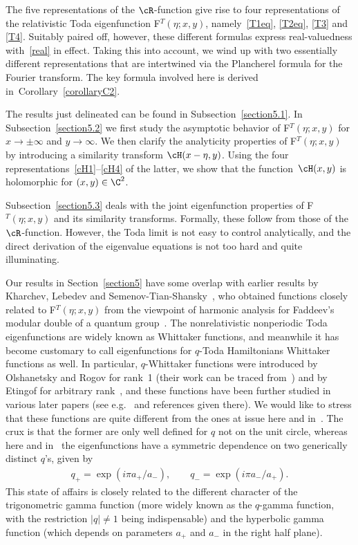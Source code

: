 \documentclass[pdftex]{sigma}
\numberwithin{equation}{section}
\begin{document}
The f\/ive representations of the $\cR$-function give rise to four representations of the relativistic Toda eigenfunction F$^T(\eta;x,y)$, namely~\eqref{T1eq}, \eqref{T2eq}, \eqref{T3} and \eqref{T4}. Suitably paired of\/f, however, these dif\/ferent formulas express real-valuedness with~\eqref{real} in ef\/fect. Taking this into account, we wind up with two essentially dif\/ferent representations that are intertwined via the Plancherel formula for the Fourier transform. The key formula involved here is derived in~Corollary~\ref{corollaryC2}.

The results just delineated can be found in Subsection~\ref{section5.1}.
In Subsection~\ref{section5.2} we f\/irst study the asymptotic behavior of F$^T(\eta;x,y)$ for $x\to \pm \infty$ and $y\to\infty$. We then clarify the analyticity properties of F$^T(\eta;x,y)$ by introducing a similarity transform $\cH(x-\eta,y)$. Using the four representations~\eqref{cH1}--\eqref{cH4} of the latter, we  show that the function~$\cH(x,y)$ is holomorphic for $(x,y)\in\C^2$.

Subsection~\ref{section5.3} deals with the joint eigenfunction properties of F$^T(\eta;x,y)$ and its similarity transforms. Formally, these follow from those of the $\cR$-function. However, the Toda limit is not easy to control analytically, and the direct derivation of the eigenvalue equations is not too hard and quite illuminating.

Our results in Section~\ref{section5} have some overlap with earlier results by Kharchev, Lebedev and Semenov-Tian-Shansky~\cite{lebe},  who obtained functions closely related to
F$^T(\eta;x,y)$ from the viewpoint of harmonic analysis for Faddeev's modular double of a quantum group~\cite{fadd1}. The non\-relativistic nonperiodic Toda eigenfunctions are widely known as Whittaker functions, and meanwhile it has become customary to call eigenfunctions for $q$-Toda Hamiltonians Whittaker functions as well. In particular, $q$-Whittaker functions were introduced by Olshanetsky and Rogov for rank~1 (their work can be traced from~\cite{olro}) and by Etingof for arbitrary rank~\cite{etin}, and these functions have been further studied in various later papers (see e.g.~\cite{cher} and refe\-ren\-ces given there). We would like to stress that these functions are quite dif\/ferent from the ones at issue here and in~\cite{lebe}. The crux is that the former are only well def\/ined for $q$ not on the unit circle, whereas here and in~\cite{lebe} the eigenfunctions have a symmetric dependence on two generically distinct $q$'s, given by
\begin{gather}\label{2q}
q_{+}=\exp(i\pi a_{+}/a_{-}),\qquad q_{-}=\exp(i\pi a_{-}/a_{+}).
\end{gather}
This state of af\/fairs is closely related to the dif\/ferent character of the trigonometric gamma function (more widely known as the $q$-gamma function, with the restriction $|q|\ne 1$ being indispensable) and the hyperbolic gamma function (which depends on parameters $a_+$ and $a_-$ in the right half plane).
\end{document}
